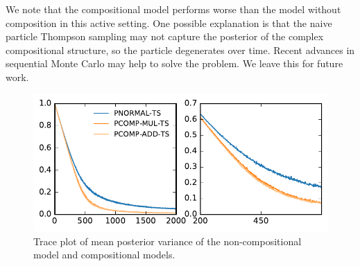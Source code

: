 We note that the compositional model performs worse than the model without 
composition in this active setting. 
One possible explanation is 
that the naive particle Thompson sampling may not capture the posterior of the 
complex compositional structure, so the particle degenerates over time. Recent
 advances in sequential Monte Carlo may help to solve the problem\cite{gu2015neural,naesseth2014sequential,lindsten2014divide}. 
We leave this for future work.
 
\begin{figure}[t]
	\centering
	
	\includegraphics[width=0.9\linewidth]{images/posterior_variance_trace_kinship.pdf}

	\caption{\label{fig:} Trace plot of mean posterior variance of the non-compositional model and compositional models.}
\end{figure}

